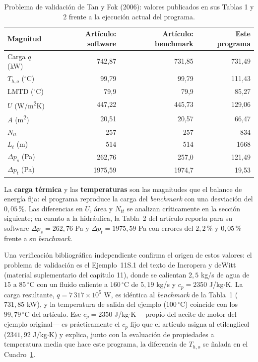 \documentclass[11pt,a4paper]{article}
\begin{document}
\begin{table}[htbp]
\centering
\caption{Problema de validaci\'on de Tan y Fok (2006): valores publicados en
sus Tablas 1 y 2 frente a la ejecuci\'on actual del programa.}
\label{tab:tanfok}
{\small
\begin{tabular}{@{}p{5.4cm}rrr@{}}
\toprule
\textbf{Magnitud} & \textbf{Art\'iculo: software} &
\textbf{Art\'iculo: benchmark} & \textbf{Este programa} \\
\midrule
Carga $q$ (kW)                       & 742,87  & 731,85  & 731,49 \\
$T_{h,o}$ ($^\circ$C)                & 99,79   & 99,79   & 111,43 \\
LMTD ($^\circ$C)                     & 79,9    & 79,9    & 85,27 \\
$U$ (W/m\textsuperscript{2}K)        & 447,22  & 445,73  & 129,06 \\
$A$ (m\textsuperscript{2})           & 20,51   & 20,57   & 66,47 \\
$N_{tt}$                             & 257     & 257     & 834 \\
$L_t$ (m)                            & 514     & 514     & 1668 \\
$\Delta p_s$ (Pa)                    & 262,76  & 257,0   & 121,49 \\
$\Delta p_t$ (Pa)                    & 1975,59 & 1974,7  & 19,53 \\
\bottomrule
\end{tabular}}
\end{table}

La \textbf{carga t\'ermica} y las \textbf{temperaturas} son las magnitudes
que el balance de energ\'ia fija: el programa reproduce la carga del
\emph{benchmark} con una desviaci\'on del $0{,}05\,\%$. Las diferencias en
$U$, \'area y $N_{tt}$ se analizan cr\'iticamente en la secci\'on siguiente;
en cuanto a la hidr\'aulica, la Tabla~2 del art\'iculo reporta para su
software $\Delta p_s = 262{,}76$ Pa y $\Delta p_t = 1975{,}59$ Pa con
errores del $2{,}2\,\%$ y $0{,}05\,\%$ frente a su \emph{benchmark}.

Una verificaci\'on bibliogr\'afica independiente confirma el origen de
estos valores: el problema de validaci\'on es el Ejemplo~11S.1 del texto
de Incropera y deWitt (material suplementario del cap\'itulo 11), donde
se calientan $2{,}5$ kg/s de agua de $15$ a $85\,^{\circ}$C con un fluido
caliente a $160\,^{\circ}$C de $5{,}19$ kg/s y $c_p = 2350$ J/kg$\cdot$K.
La carga resultante, $q = 7\,317\times 10^5$ W, es id\'entica al
\emph{benchmark} de la Tabla~1 ($731{,}85$ kW), y la temperatura de salida
del ejemplo ($100\,^{\circ}$C) coincide con los $99{,}79\,^{\circ}$C del art\'iculo.
Ese $c_p = 2350$ J/kg$\cdot$K ---propio del aceite de motor del ejemplo
original--- es pr\'acticamente el $c_p$ fijo que el art\'iculo asigna al
etilenglicol ($2341{,}92$ J/kg$\cdot$K) y explica, junto con la evaluaci\'on
de propiedades a temperatura media que hace este programa, la diferencia
de $T_{h,o}$ se
ñalada en el Cuadro~\ref{tab:tanfok}.
\end{document}
